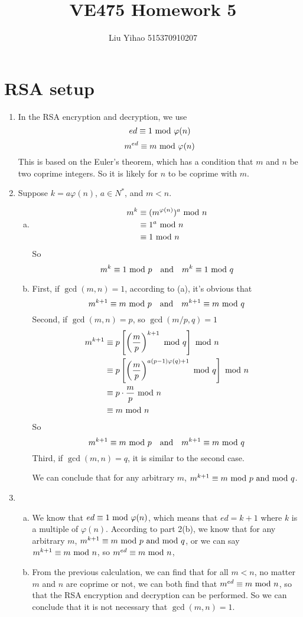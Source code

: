 \documentclass{article}
\title{VE475 Homework 5}
\author{Liu Yihao 515370910207}
\date{}
\renewcommand{\mod}{{\rm\ mod\ }}
\begin{document}
\maketitle

\section{RSA setup}
\begin{enumerate}
\item
In the RSA encryption and decryption, we use $$ed\equiv1\mod\varphi(n)$$
$$m^{ed}\equiv m\mod\varphi(n)$$
This is based on the Euler's theorem, which has a condition that $m$ and $n$ be two coprime integers. So it is likely for $n$ to be coprime with $m$.
\item
Suppose $k=a\varphi(n)$, $a\in N^*$, and $m<n$.
\begin{enumerate}[(a)]
\item
\begin{align*}
m^k&\equiv(m^{\varphi(n)})^a\mod n\\
&\equiv1^a\mod n\\
&\equiv1\mod n\\
\end{align*}
So $$m^k\equiv1\mod p\quad{\rm and}\quad m^k\equiv1\mod q$$
\item
First, if $\gcd(m,n)=1$, according to (a), it's obvious that
$$m^{k+1}\equiv m\mod p\quad{\rm and}\quad m^{k+1}\equiv m\mod q$$
Second, if $\gcd(m,n)=p$, so $\gcd(m/p,q)=1$
\begin{align*}
m^{k+1}&\equiv p\left[\left(\frac{m}{p}\right)^{k+1}\mod q\right]\mod n\\
&\equiv p\left[\left(\frac{m}{p}\right)^{a(p-1)\varphi(q)+1}\mod q\right]\mod n\\
&\equiv p\cdot\frac{m}{p}\mod n\\
&\equiv m\mod n
\end{align*}
So $$m^{k+1}\equiv m\mod p\quad{\rm and}\quad m^{k+1}\equiv m\mod q$$
Third, if $\gcd(m,n)=q$, it is similar to the second case.

We can conclude that for any arbitrary $m$, $m^{k+1}\equiv m\mod p{\rm\ and}\mod q$.
\end{enumerate}
\item
\begin{enumerate}[(a)]
\item
We know that $ed\equiv1\mod\varphi(n)$, which means that $ed=k+1$ where $k$ is a multiple of $\varphi(n)$. According to part 2(b), we know that for any arbitrary $m$, $m^{k+1}\equiv m\mod p{\rm\ and}\mod q$, or we can say $m^{k+1}\equiv m\mod n$, so $m^{ed}\equiv m\mod n$,
\item
From the previous calculation, we can find that for all $m<n$, no matter $m$ and $n$ are coprime or not, we can both find that $m^{ed}\equiv m\mod n$, so that the RSA encryption and decryption can be performed. So we can conclude that it is not necessary that $\gcd(m,n)=1$.
\end{enumerate}
\end{enumerate}
\end{document}
